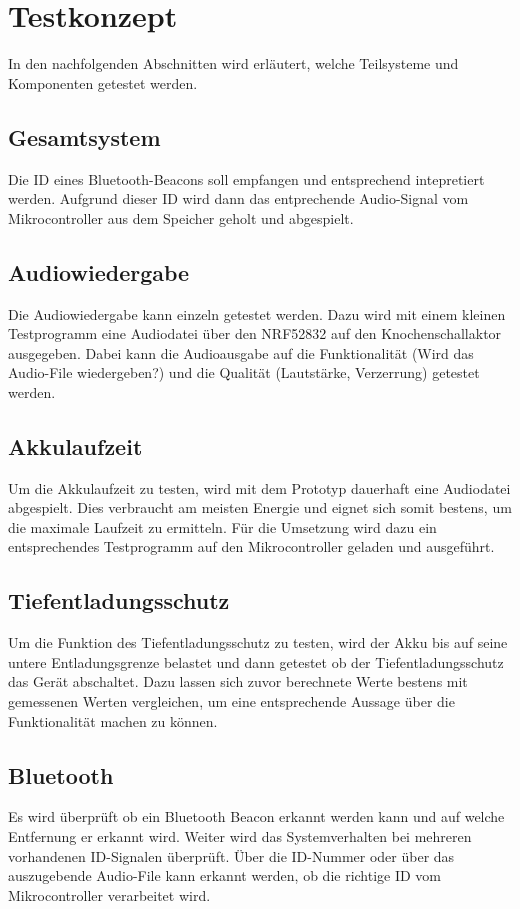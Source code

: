 \section{Testkonzept}
In den nachfolgenden Abschnitten wird erläutert, welche Teilsysteme und Komponenten getestet werden.

\subsection{Gesamtsystem}
Die ID eines Bluetooth-Beacons soll empfangen und entsprechend intepretiert werden. Aufgrund dieser ID wird dann das entprechende Audio-Signal vom Mikrocontroller aus dem Speicher geholt und abgespielt. 

\subsection{Audiowiedergabe}
Die Audiowiedergabe kann einzeln getestet werden. Dazu wird mit einem kleinen Testprogramm eine Audiodatei über den NRF52832 auf den Knochenschallaktor ausgegeben. Dabei kann die Audioausgabe auf die Funktionalität (Wird das Audio-File wiedergeben?) und die Qualität (Lautstärke, Verzerrung) getestet werden.

\subsection{Akkulaufzeit}
Um die Akkulaufzeit zu testen, wird mit dem Prototyp dauerhaft eine Audiodatei abgespielt. Dies verbraucht am meisten Energie und eignet sich somit bestens, um die maximale Laufzeit zu ermitteln. Für die Umsetzung wird dazu ein entsprechendes Testprogramm auf den Mikrocontroller geladen und ausgeführt.

\subsection{Tiefentladungsschutz}
Um die Funktion des Tiefentladungsschutz zu testen, wird der Akku bis auf seine untere Entladungsgrenze belastet und dann getestet ob der Tiefentladungsschutz das Gerät abschaltet. Dazu lassen sich zuvor berechnete Werte bestens mit gemessenen Werten vergleichen, um eine entsprechende Aussage über die Funktionalität machen zu können.

\subsection{Bluetooth}
Es wird überprüft ob ein Bluetooth Beacon erkannt werden kann und auf welche Entfernung er erkannt wird. Weiter wird das Systemverhalten bei mehreren vorhandenen ID-Signalen überprüft. Über die ID-Nummer oder über das auszugebende Audio-File kann erkannt werden, ob die richtige ID vom Mikrocontroller verarbeitet wird.
